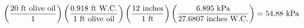 





$$\left( {{20 \hbox{ ft olive oil}} \over 1} \right)  \left({{0.918 \hbox{ ft W.C.}} \over {1 \hbox{ ft olive oil}}}\right) \left({{12 \hbox{ inches}} \over {1 \hbox{ ft}}}\right)  \left( {{6.895 \hbox{ kPa}} \over {27.6807 \hbox{ inches W.C.}}} \right) = 54.88 \hbox{ kPa}$$










